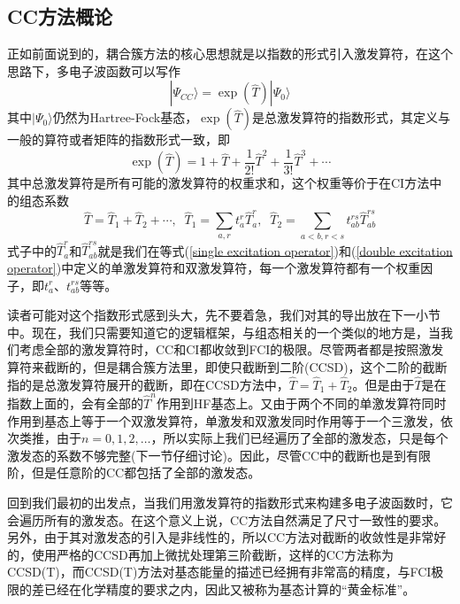 \documentclass[12pt,a4paper,openany,twoside]{book}
\numberwithin{equation}{section}
\begin{document}
        \subsection{CC方法概论}
          正如前面说到的，耦合簇方法的核心思想就是以指数的形式引入激发算符，在这个思路下，多电子波函数可以写作
          \begin{equation}
            | \Psi_{CC} \rangle = \exp(\hat{T}) | \Psi_0 \rangle
          \end{equation}
          其中$ | \Psi_0 \rangle$仍然为Hartree-Fock基态，$\exp(\hat{T})$是总激发算符的指数形式，其定义与一般的算符或者矩阵的指数形式一致，即
          \begin{equation}
            \exp(\hat{T}) = 1 + \hat{T} + \frac{1}{2!}\hat{T}^2+ \frac{1}{3!}\hat{T}^3 + \cdots
          \end{equation}
          其中总激发算符是所有可能的激发算符的权重求和，这个权重等价于在CI方法中的组态系数
          \begin{equation}
            \hat{T} = \hat{T}_1 +\hat{T}_2 +\cdots, \;\;\hat{T}_1 = \sum_{a,r}t_a^r\hat{T}_a^r,\;\;\hat{T}_2 = \sum_{a<b,r<s}t_{ab}^{rs}\hat{T}_{ab}^{rs}
          \end{equation}
          式子中的$\hat{T}_a^r$和$\hat{T}_{ab}^{rs}$就是我们在等式(\ref{single excitation operator})和(\ref{double excitation operator})中定义的单激发算符和双激发算符，每一个激发算符都有一个权重因子，即$t_a^r$、$t_{ab}^{rs}$等等。

          读者可能对这个指数形式感到头大，先不要着急，我们对其的导出放在下一小节中。现在，我们只需要知道它的逻辑框架，与组态相关的一个类似的地方是，当我们考虑全部的激发算符时，CC和CI都收敛到FCI的极限。尽管两者都是按照激发算符来截断的，但是耦合簇方法里，即使只截断到二阶(CCSD)，这个二阶的截断指的是总激发算符展开的截断，即在CCSD方法中，$ \hat{T} = \hat{T}_1 +\hat{T}_2 $。但是由于$ \hat{T} $是在指数上面的，会有全部的$\hat{T}^n$作用到HF基态上。又由于两个不同的单激发算符同时作用到基态上等于一个双激发算符，单激发和双激发同时作用等于一个三激发，依次类推，由于$n = 0,1,2,\dots$，所以实际上我们已经遍历了全部的激发态，只是每个激发态的系数不够完整(下一节仔细讨论)。因此，尽管CC中的截断也是到有限阶，但是任意阶的CC都包括了全部的激发态。

          回到我们最初的出发点，当我们用激发算符的指数形式来构建多电子波函数时，它会遍历所有的激发态。在这个意义上说，CC方法自然满足了尺寸一致性的要求。另外，由于其对激发态的引入是非线性的，所以CC方法对截断的收敛性是非常好的，使用严格的CCSD再加上微扰处理第三阶截断，这样的CC方法称为CCSD(T)，而CCSD(T)方法对基态能量的描述已经拥有非常高的精度，与FCI极限的差已经在化学精度的要求之内，因此又被称为基态计算的“黄金标准”。
\end{document}
